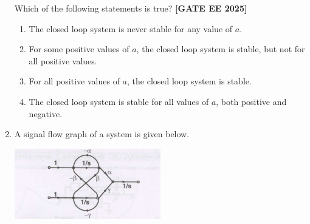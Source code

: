 \documentclass[12pt,a4paper]{article}
\begin{document}
\begin{enumerate}[leftmargin=*, label=\textbf{Q.\arabic*:}]
Which of the following statements is true?
\newline
\noindent \textbf{[GATE EE 2025]}
\begin{enumerate}[label=(\Alph*)]
  \item The closed loop system is never stable for any value of $a$.
  \item For some positive values of $a$, the closed loop system is stable, but not for all positive values.
  \item For all positive values of $a$, the closed loop system is stable.
  \item The closed loop system is stable for all values of $a$, both positive and negative.
\end{enumerate}
\newpage
\item A signal flow graph of a system is given below.
\begin{center}
\includegraphics[width=0.5\textwidth]{figs/q40.png}
\end{center}



\end{enumerate}
\end{document}
